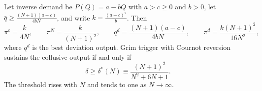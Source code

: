 \begin{proposition}\label{prop:12-cournot}
Let inverse demand be $P(Q) = a - bQ$ with $a > c \ge 0$ and $b > 0$, let $\bar q \ge \frac{(N + 1)(a - c)}{4bN}$,
and write $k = \frac{(a - c)^2}{b}$. Then
\begin{equation}\label{eq:12-cournot-profits}
\pi^c = \frac{k}{4N}, \qquad \pi^N = \frac{k}{(N + 1)^2}, \qquad
q^d = \frac{(N + 1)(a - c)}{4bN}, \qquad \pi^d = \frac{k(N + 1)^2}{16N^2},
\end{equation}
where $q^d$ is the best deviation output. Grim trigger with Cournot reversion sustains the collusive output if and
only if
\begin{equation}\label{eq:12-cournot-delta}
\delta \ge \delta^*(N) \equiv \frac{(N + 1)^2}{N^2 + 6N + 1} .
\end{equation}
The threshold rises with $N$ and tends to one as $N \to \infty$.
\end{proposition}

